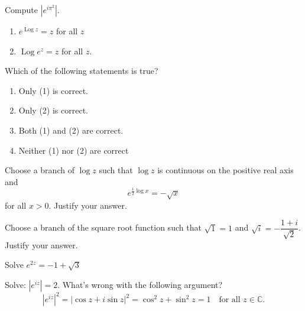 \documentclass[answers, 12pt]{exam}
\newcommand{\CC}{\mathbb{C}}
\DeclareMathOperator{\Log}{Log}
\DeclareMathOperator{\Arg}{Arg}
\begin{document}
\begin{questions}

\question
Compute $|e^{i\pi^2}|$.

\begin{enumerate}
    \item $e^{\Log z} = z$ for all $z$
    \item $\Log e^z = z$ for all $z$.
\end{enumerate}

Which of the following statements is true?
\begin{enumerate}
    \item Only (1) is correct.
    \item Only (2) is correct.
    \item Both (1) and (2) are correct.
    \item Neither (1) nor (2) are correct
\end{enumerate}

Choose a branch of $\log z$ such that $\log z$ is continuous on the positive real axis and
\[
e^{\frac12\log x} = -\sqrt x
\]
for all $x>0$. Justify your answer.

Choose a branch of the square root function such that
    $\sqrt 1=1$ and $\sqrt i = -\dfrac{1+i}{\sqrt 2}$.
    Justify your answer.

Solve $e^{2z} = -1+\sqrt 3$

Solve: $|e^{iz}|=2$.
What's wrong with the following argument?
\[
    |e^{iz}|^2= |\cos z + i\sin z|^2 = \cos^2 z + \sin^2 z = 1 \quad\text{for all $z\in\CC$.}
\]

\question
{}
\end{questions}
\end{document}
